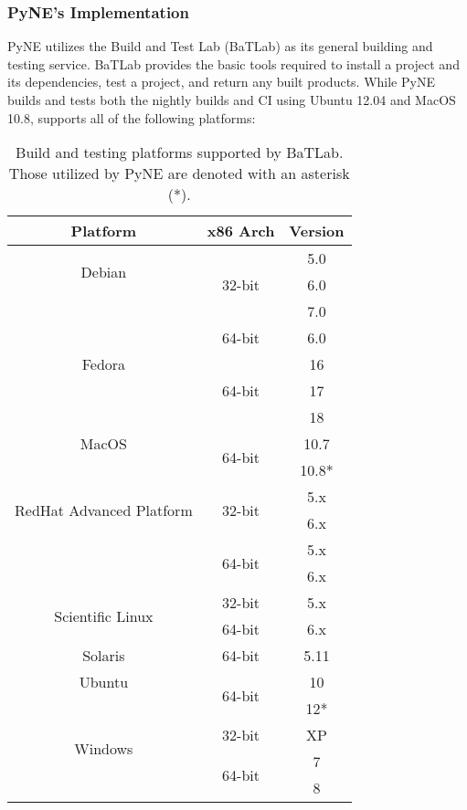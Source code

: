 \documentclass{anstrans}
\begin{document}
\subsubsection{PyNE's Implementation}

PyNE utilizes the Build and Test Lab (BaTLab) \cite{batlab_2014} as its general
building and testing service. BaTLab provides the basic tools required to
install a project and its dependencies, test a project, and return any built
products. While PyNE builds and tests both the nightly builds and CI using
Ubuntu 12.04 and MacOS 10.8, supports all of the following platforms:

\begin{table}[ht]
  \begin{center}
    \caption{\label{tab::batlab}Build and testing platforms supported by BaTLab. 
      Those utilized by PyNE are denoted with an asterisk (*).}
    \begin{tabular}{|c|c|c|}
    \hline
    Platform & x86 Arch & Version \\
    \hline
    \multirow{2}{*}{Debian} 
    & \multirow{3}{*}{32-bit} & 5.0 \\ & & 6.0 \\ & & 7.0 \\ 
    \cline{2-3}
    & \multirow{1}{*}{64-bit} & 6.0 \\
    \hline
    \multirow{1}{*}{Fedora} 
    & \multirow{3}{*}{64-bit} & 16 \\ & & 17 \\ & & 18 \\
    \hline
    \multirow{1}{*}{MacOS} 
    & \multirow{2}{*}{64-bit} & 10.7 \\ & & 10.8* \\
    \hline
    \multirow{2}{*}{RedHat Advanced Platform} 
    & \multirow{2}{*}{32-bit} & 5.x \\ & & 6.x \\ 
    \cline{2-3}
    & \multirow{2}{*}{64-bit} & 5.x \\ & & 6.x \\
    \hline
    \multirow{2}{*}{Scientific Linux} 
    & \multirow{1}{*}{32-bit} & 5.x \\ 
    \cline{2-3}
    & \multirow{1}{*}{64-bit} & 6.x \\
    \hline
    \multirow{1}{*}{Solaris} 
    & \multirow{1}{*}{64-bit} & 5.11 \\
    \hline
    \multirow{1}{*}{Ubuntu} 
    & \multirow{2}{*}{64-bit} & 10 \\ & & 12* \\
    \hline
    \multirow{2}{*}{Windows} 
    & \multirow{1}{*}{32-bit} & XP \\ 
    \cline{2-3}
    & \multirow{2}{*}{64-bit} & 7 \\ & & 8 \\
    \hline
    \end{tabular}
  \end{center}
\end{table}
\end{document}
